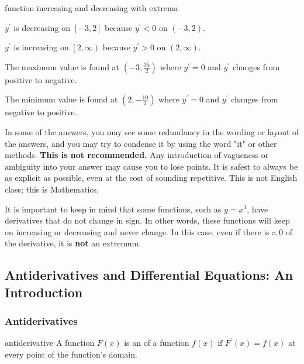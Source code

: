 \begin{example}{function increasing and decreasing with extrema}
\begin{center}
        \( y^\prime \) is decreasing on \( \left[ -3, 2 \right] \) because \( y^\prime < 0 \) on \( \left( -3, 2 \right) \).
        
        \( y^\prime \) is increasing on \( \left[ 2, \infty \right) \) because \( y^\prime > 0 \) on \( \left( 2, \infty \right) \).
        
        \vspace{0.4cm}
        
        The maximum value is found at \( \left( -3, \frac{35}{2} \right) \) where \( y^\prime = 0 \) and \( y^\prime \) changes from positive to negative.
        
        The minimum value is found at \( \left( 2, -\frac{10}{3} \right) \) where \( y^\prime = 0 \) and \( y^\prime \) changes from negative to positive.
    \end{center}
\end{example}

\begin{tip}
    In some of the answers, you may see some redundancy in the wording or layout of the answers, and you may try to condense it by using the word "it" or other methods. \textbf{This is not recommended.} Any introduction of vagueness or ambiguity into your answer may cause you to lose points. It is safest to always be as explicit as possible, even at the cost of sounding repetitive. This is not English class; this is Mathematics.
\end{tip}

It is important to keep in mind that some functions, such as \( y = x^3 \), have derivatives that do not change in sign. In other words, these functions will keep on increasing or decreasing and never change. In this case, even if there is a \( 0 \) of the derivative, it is \textbf{not} an extremum.

\subsection{Antiderivatives and Differential Equations: An Introduction}

\subsubsection{Antiderivatives}

\begin{definition}{antiderivative}
    A function \( F \left( x \right) \) is an  of a function \( f \left( x \right) \) if \( F^\prime \left( x \right) = f \left( x \right) \) at every point of the function's domain.
\end{definition}

